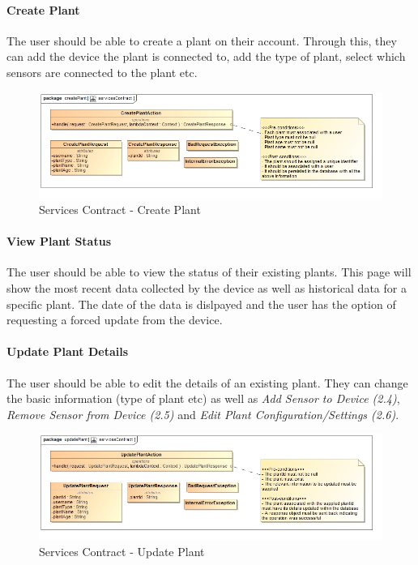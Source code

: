 \documentclass{article}
\let\cleardoublepage\clearpage
\begin{document}
			\paragraph{Create Plant}
			The user should be able to create a plant on their account. Through this, they can add the device the plant is connected to, add the type of plant, select which sensors are connected to the plant etc.
			\begin{figure}[H]
				\includegraphics[width=\linewidth]{../images/ServicesContracts/createPlant.jpg}
				\caption{Services Contract - Create Plant}
			\end{figure}
			
\cleardoublepage
			\paragraph{View Plant Status}
			The user should be able to view the status of their existing plants. This page will show the most recent data collected by the device as well as historical data for a specific plant. The date of the data is dislpayed and the user has the option of requesting a forced update from the device.
			\paragraph{Update Plant Details}
			The user should be able to edit the details of an existing plant. They can change the basic information (type of plant etc) as well as \emph{Add Sensor to Device (2.4)}, \emph{Remove Sensor from Device (2.5)} and \emph{Edit Plant Configuration/Settings (2.6)}.
			\begin{figure}[H]
				\includegraphics[width=\linewidth]{../images/ServicesContracts/updatePlant.jpg}
				\caption{Services Contract - Update Plant}
			\end{figure}
\end{document}

